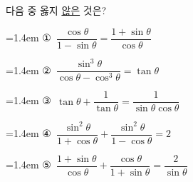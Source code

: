 다음 중 옳지 \underline{않은} 것은?
\par\medskip\par\noindent\hangindent=1.4em {\small ①}\ $\dfrac{\cos\theta}{1-\sin\theta}=\dfrac{1+\sin\theta}{\cos\theta}$\par\noindent\hangindent=1.4em {\small ②}\ $\dfrac{\sin^3\theta}{\cos\theta-\cos^3\theta}=\tan\theta$\par\noindent\hangindent=1.4em {\small ③}\ $\tan\theta+\dfrac{1}{\tan\theta}=\dfrac{1}{\sin\theta\cos\theta}$\par\noindent\hangindent=1.4em {\small ④}\ $\dfrac{\sin^2\theta}{1+\cos\theta}+\dfrac{\sin^2\theta}{1-\cos\theta}=2$\par\noindent\hangindent=1.4em {\small ⑤}\ $\dfrac{1+\sin\theta}{\cos\theta}+\dfrac{\cos\theta}{1+\sin\theta}=\dfrac{2}{\sin\theta}$\par\medskip
